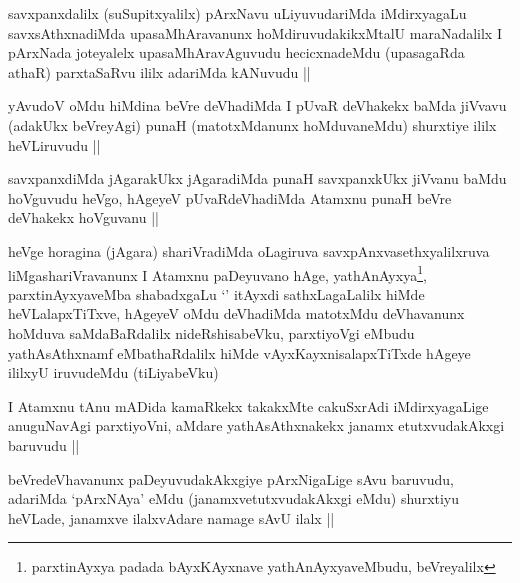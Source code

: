 \begin{artha}
savxpanxdalilx (suSupitxyalilx) pArxNavu uLiyuvudariMda iMdirxyagaLu
savxsAthxnadiMda upasaMhAravanunx hoMdiruvudakikxMtalU maraNadalilx I
pArxNada joteyalelx upasaMhAravAguvudu hecicxnadeMdu (upasagaRda
athaR) parxtaSaRvu ililx adariMda kANuvudu ||
\end{artha}


\begin{artha}
yAvudoV oMdu hiMdina beVre deVhadiMda I pUvaR deVhakekx baMda jiVvavu
(adakUkx beVreyAgi) punaH (matotxMdanunx hoMduvaneMdu) shurxtiye ililx
heVLiruvudu ||
\end{artha}


\begin{artha}
savxpanxdiMda jAgarakUkx jAgaradiMda punaH savxpanxkUkx jiVvanu baMdu
hoVguvudu heVgo, hAgeyeV pUvaRdeVhadiMda Atamxnu punaH beVre deVhakekx
hoVguvanu ||
\end{artha}


\begin{artha}
heVge horagina (jAgara) shariVradiMda oLagiruva
savxpAnxvasethxyalilxruva liMgashariVravanunx I Atamxnu paDeyuvano
hAge, yathAnAyxya\footnote[1]{parxtinAyxya padada bAyxKAyxnave
  yathAnAyxyaveMbudu, beVreyalilx}, parxtinAyxyaveMba shabadxgaLu
`\stext' itAyxdi sathxLagaLalilx hiMde heVLalapxTiTxve, hAgeyeV oMdu
deVhadiMda matotxMdu deVhavanunx hoMduva saMdaBaRdalilx
nideRshisabeVku, parxtiyoVgi eMbudu yathAsAthxnamf eMbathaRdalilx
hiMde vAyxKayxnisalapxTiTxde hAgeye ililxyU iruvudeMdu (tiLiyabeVku)
\end{artha}


\begin{artha}
I Atamxnu tAnu mADida kamaRkekx takakxMte cakuSxrAdi iMdirxyagaLige
anuguNavAgi parxtiyoVni, aMdare yathAsAthxnakekx janamx
etutxvudakAkxgi baruvudu ||
\end{artha}

\begin{artha}
beVredeVhavanunx paDeyuvudakAkxgiye pArxNigaLige sAvu baruvudu,
adariMda `pArxNAya' eMdu (janamxvetutxvudakAkxgi eMdu) shurxtiyu
heVLade, janamxve ilalxvAdare namage sAvU ilalx ||
\end{artha}

